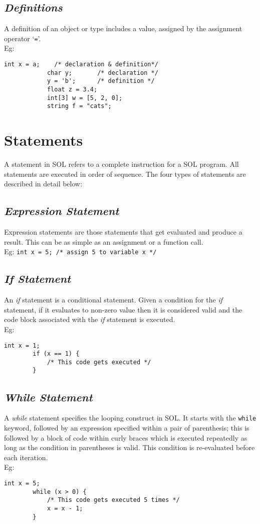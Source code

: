 \documentclass[letterpaper,12pt]{article}
\begin{document}
    \subsection{\textit{Definitions}}
    A definition of an object or type includes a value, assigned by the assignment operator `\texttt{=}'.\\
    Eg: \begin{lstlisting}[aboveskip=-13pt]
            int x = a;    /* declaration & definition*/
            char y;       /* declaration */
            y = 'b';      /* definition */
            float z = 3.4;
            int[3] w = [5, 2, 0];
            string f = "cats";
        \end{lstlisting}

\section{Statements} \label{classes}
A statement in SOL refers to a complete instruction for a SOL program. All statements are executed in order of sequence. The four types of statements are described in detail below:\\

\subsection{\textit{Expression Statement}}
Expression statements are those statements that get evaluated and produce a result. This can be as simple as an assignment or a function call.\\
Eg: \texttt{int x = 5; /* assign 5 to variable x */}

\subsection{\textit{If Statement}}
An \textit{if} statement is a conditional statement. Given a condition for the \textit{if} statement, if it evaluates to non-zero value then it is considered valid and the code block associated with the \textit{if} statement is executed.\\
Eg: \begin{lstlisting}[aboveskip=-13pt]
        int x = 1;
        if (x == 1) {
            /* This code gets executed */
        }
    \end{lstlisting}

\subsection{\textit{While Statement}}
A \textit{while} statement specifies the looping construct in SOL. It starts with the \texttt{while} keyword, followed by an expression specified within a pair of parenthesis; this is followed by a block of code within curly braces which is executed repeatedly as long as the condition in parentheses is valid. This condition is re-evaluated before each iteration. \\
Eg: \begin{lstlisting}[aboveskip=-13pt]
        int x = 5;
        while (x > 0) {
            /* This code gets executed 5 times */
            x = x - 1;
        }
    \end{lstlisting}
\end{document}
